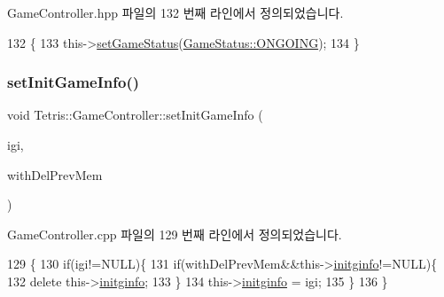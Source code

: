 Game\+Controller.\+hpp 파일의 132 번째 라인에서 정의되었습니다.


\begin{DoxyCode}
132                                          \{
133                 this->\hyperlink{class_tetris_1_1_game_controller_a013cef75ba09bdb7d95ae1df8497b8f5}{setGameStatus}(\hyperlink{class_tetris_1_1_game_controller_a96a963b56385f3b3a122ff0ca2beb770acff9d04a8a29792d319be9177afb8ba3}{GameStatus::ONGOING});
134             \}
\end{DoxyCode}
\mbox{\label{class_tetris_1_1_game_controller_a0d835f535b48529ca536115dd8123099}} 
\subsubsection{\texorpdfstring{set\+Init\+Game\+Info()}{setInitGameInfo()}\hspace{0.1cm}{\footnotesize\ttfamily [1/2]}}
{\footnotesize\ttfamily void Tetris\+::\+Game\+Controller\+::set\+Init\+Game\+Info (\begin{DoxyParamCaption}\item[{\hyperlink{class_tetris_1_1_init_game_info}{Init\+Game\+Info} $\ast$}]{igi,  }\item[{bool}]{with\+Del\+Prev\+Mem }\end{DoxyParamCaption})}



Game\+Controller.\+cpp 파일의 129 번째 라인에서 정의되었습니다.


\begin{DoxyCode}
129                                                                              \{
130                 \textcolor{keywordflow}{if}(igi!=NULL)\{
131                     \textcolor{keywordflow}{if}(withDelPrevMem&&this->\hyperlink{class_tetris_1_1_game_controller_adaefa9bbdd0d73ec58173dce327373ca}{initginfo}!=NULL)\{
132                         \textcolor{keyword}{delete} this->\hyperlink{class_tetris_1_1_game_controller_adaefa9bbdd0d73ec58173dce327373ca}{initginfo};
133                     \}
134                     this->\hyperlink{class_tetris_1_1_game_controller_adaefa9bbdd0d73ec58173dce327373ca}{initginfo} = igi;
135                 \}
136             \}
\end{DoxyCode}
\mbox{\label{class_tetris_1_1_game_controller_a0d835f535b48529ca536115dd8123099}} 

